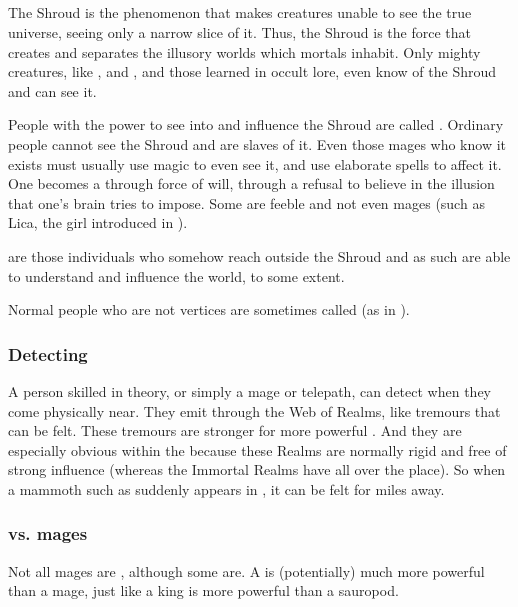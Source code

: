 \subsection{\Vertex}
\index{\matrix}
The Shroud is the phenomenon that makes creatures unable to see the true universe, seeing only a narrow slice of it. Thus, the Shroud is the force that creates and separates the illusory worlds which mortals inhabit. Only mighty creatures, like \dragons, \banes{} and \resphain, and those learned in occult lore, even know of the Shroud and can see it.

\index{\vertex}
People with the power to see into and influence the Shroud are called \vertices. 
Ordinary people cannot see the Shroud and are slaves of it. 
Even those mages who know it exists must usually use magic to even see it, and use elaborate spells to affect it. 
One becomes a \vertex{} through force of will, through a refusal to believe in the illusion that one's brain tries to impose. 
Some \vertices{} are feeble and not even mages (such as Lica, the  girl introduced in \emph{\LicaBook}). 

\Vertices{} are those individuals who somehow reach outside the Shroud and as such are able to understand and influence the world, to some extent. 

Normal people who are not vertices are sometimes called  (as in ). 





\subsubsection{Detecting \vertices}
A person skilled in \matrix{} theory, or simply a mage or telepath, can detect \vertices{} when they come physically near. 
They emit  through the Web of Realms, like tremours that can be felt. 
These tremours are stronger for more powerful \vertices. 
And they are especially obvious within the  because these Realms are normally rigid and free of strong \vertex{} influence (whereas the Immortal Realms have \vertices{} all over the place). 
So when a mammoth \vertex{} such as \QuessanthIshnaruchaefir{} suddenly appears in \Azmith, it can be felt for miles away. 





\subsubsection{\Vertices vs. mages}
Not all mages are \vertices, although some are. 
A \vertex{} is (potentially) much more powerful than a mage, just like a king is more powerful than a sauropod. 









